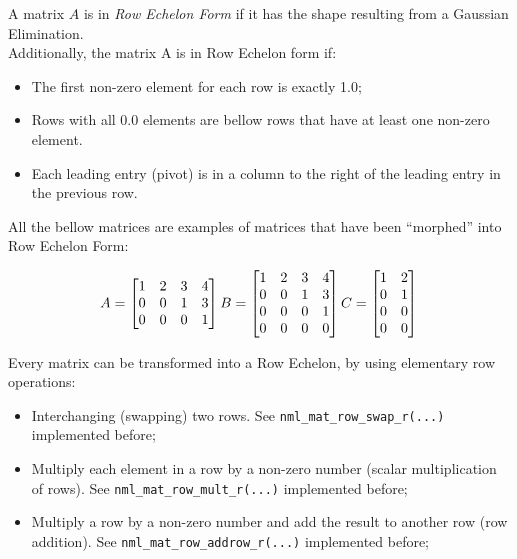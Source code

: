 A matrix $A$ is in \textit{Row Echelon Form} if it has the shape resulting from a Gaussian Elimination.
\\

Additionally, the matrix A is in Row Echelon form if:

\begin{itemize}
\item The first non-zero element for each row is exactly 1.0;
\item Rows with all 0.0 elements are bellow rows that have at least one non-zero element.
\item Each leading entry (pivot) is in a column to the right of the leading entry in the previous row.
\end{itemize}

All the bellow matrices are examples of matrices that have been ``morphed'' into Row Echelon Form:

$$
A=
\begin{bmatrix}
1 & 2 & 3 & 4 \\
0 & 0 & 1 & 3 \\
0 & 0 & 0 & 1 
\end{bmatrix}
\\
B=
\begin{bmatrix}
1 & 2 & 3 & 4 \\
0 & 0 & 1 & 3 \\
0 & 0 & 0 & 1 \\
0 & 0 & 0 & 0
\end{bmatrix}
\\
C=
\begin{bmatrix}
1 & 2 \\
0 & 1 \\
0 & 0 \\
0 & 0
\end{bmatrix}
\\
$$

Every matrix can be transformed into a Row Echelon, by using elementary row operations:

\begin{itemize}
\item Interchanging (swapping) two rows. See {\tt nml\_mat\_row\_swap\_r(...)} implemented before;
\item Multiply each element in a row by a non-zero number (scalar multiplication of rows). See {\tt nml\_mat\_row\_mult\_r(...)} implemented before;
\item Multiply a row by a non-zero number and add the result to another row (row addition). See {\tt nml\_mat\_row\_addrow\_r(...)} implemented before;
\end{itemize}

